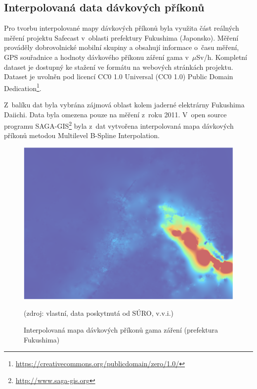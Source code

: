 \subsection{Interpolovaná data dávkových příkonů} Pro tvorbu
interpolované mapy dávkových příkonů byla využita část reálných měření
projektu Safecast v~oblasti prefektury Fukushima (Japonsko). Měření
prováděly dobrovolnické mobilní skupiny a obsahují informace o~času
měření, GPS souřadnice a hodnoty dávkového příkonu záření gama
v~$\mu$Sv/h. Kompletní dataset je dostupný ke stažení ve formátu
 na webových stránkách projektu. Dataset je uvolněn pod
licencí CC0 1.0 Universal (CC0 1.0) Public Domain
Dedication\footnote{\url{https://creativecommons.org/publicdomain/zero/1.0/}}.

Z~balíku dat byla vybrána zájmová oblast kolem jaderné elektrárny
Fukushima Daiichi. Data byla omezena pouze na měření z~roku
2011. V~open source programu
SAGA-GIS\footnote{\url{http://www.saga-gis.org}} byla z~dat
vytvořena interpolovaná mapa dávkových příkonů metodou Multilevel
B-Spline
Interpolation.

\begin{figure}[H] \centering
    \includegraphics[scale=0.4]{./pictures/interpolovana_mapa.png}
      	\caption[Interpolovaná mapa dávkových příkonů (prefektura
Fukushima)]{Interpolovaná mapa dávkových příkonů gama záření
(prefektura Fukushima)}(zdroj: vlastní, data poskytnutá od SÚRO,
v.v.i.)
    	\label{fig:interpolatedMap}
\end{figure}

